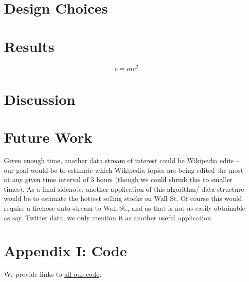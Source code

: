 \documentclass[twoside]{article}
\begin{document}
\begin{multicols}{2}
\section{Design Choices}

\lipsum[1]


\section{Results}


\lipsum[5] %

\begin{equation}
\label{eq:emc}
e = mc^2
\end{equation}

\lipsum[6] %


\section{Discussion}

\lipsum[7] %

\section{Future Work} \label{sec:Future Work}

Given enough time, another data stream of interest could be Wikipedia edits -- our goal would be to estimate which Wikipedia topics are being edited the most at any given time interval of 3 hours (though we could shrink this to smaller times). As a final sidenote, another application of this algorithm/ data structure would be to estimate the hottest selling stocks on Wall St. Of course this would require a firehose data stream to Wall St., and as that is not as easily obtainable as say, Twitter data, we only mention it as another useful application.

\section{Appendix I: Code} \label{sec:Appendix_code}

We provide links to \href{https://github.com/kiranvodrahalli/cos521/}{all our code}.

\end{multicols}
\end{document}
